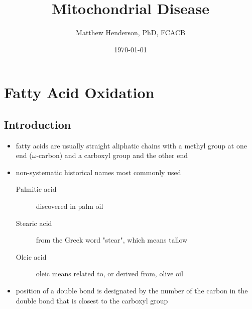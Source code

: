 \documentclass{scrartcl}
\author{Matthew Henderson, PhD, FCACB}
\date{\today}
\title{Mitochondrial Disease}
\begin{document}
\maketitle
\tableofcontents


\section{Fatty Acid Oxidation}
\label{sec:orge6f9f74}
\subsection{Introduction}
\label{sec:orgdee7b70}
\begin{itemize}
\item fatty acids are usually straight aliphatic chains with a methyl
group at one end (\(\omega\)-carbon) and a carboxyl group and the other
end
\end{itemize}


\begin{itemize}
\item non-systematic historical names most commonly used
\begin{description}
\item[{Palmitic acid}] discovered in palm oil
\item[{Stearic acid}] from the Greek word "stear", which means tallow
\item[{Oleic acid}] oleic means related to, or derived from, olive oil
\end{description}
\item position of a double bond is designated by the number of the carbon in the double bond that is closest to the carboxyl group
\end{itemize}
\end{document}
